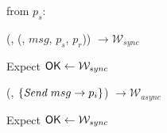 \begin{bbox}[title={$\F_{\msf{sync-chain}}(p_s, p_r, r, \Delta)$}]

\OnInput {} from $p_s$:
	\begin{renumerate}
	\item \Send (, (, $msg$, $p_s$, $p_r$)) $\rightarrow \mathcal{W}_{sync}$
 	\item Expect ${\mathsf {OK}} \leftarrow \mathcal{W}_{sync}$
	\item \Send (, $\{\emph{Send}~ msg \rightarrow p_i\}$) $\rightarrow \mathcal{W}_{async}$
	\item Expect ${\mathsf {OK}} \leftarrow \mathcal{W}_{sync}$
	\end{renumerate}
\end{bbox}

